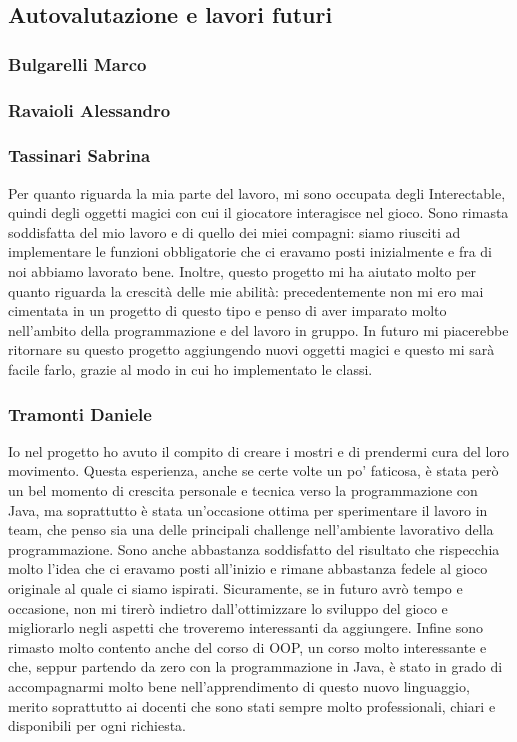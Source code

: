 \documentclass{report}
\begin{document}
\subsection{Autovalutazione e lavori futuri}

\subsubsection{Bulgarelli Marco}

\subsubsection{Ravaioli Alessandro}

\subsubsection{Tassinari Sabrina}
Per quanto riguarda la mia parte del lavoro, mi sono occupata degli Interectable, quindi degli oggetti magici con cui il giocatore interagisce nel gioco.
%
Sono rimasta soddisfatta del mio lavoro e di quello dei miei compagni: siamo riusciti ad implementare le funzioni obbligatorie che ci eravamo posti inizialmente e fra di noi abbiamo lavorato bene. 
%
Inoltre, questo progetto mi ha aiutato molto per quanto riguarda la crescità delle mie abilità: precedentemente non mi ero mai cimentata in un progetto di questo tipo e penso di aver imparato molto nell'ambito della programmazione e del lavoro in gruppo.
%
In futuro mi piacerebbe ritornare su questo progetto aggiungendo nuovi oggetti magici e questo mi sarà facile farlo, grazie al modo in cui ho implementato le classi.
%
 

\subsubsection{Tramonti Daniele}
Io nel progetto ho avuto il compito di creare i mostri e di prendermi cura del loro movimento.
%
Questa esperienza, anche se certe volte un po' faticosa, è stata però un bel momento di crescita personale e tecnica verso la programmazione con Java, ma soprattutto è stata un'occasione
%
ottima per sperimentare il lavoro in team, che penso sia una delle principali challenge nell'ambiente lavorativo della programmazione. Sono anche abbastanza soddisfatto del risultato che 
%
rispecchia molto l'idea che ci eravamo posti all'inizio e rimane abbastanza fedele al gioco originale al quale ci siamo ispirati. Sicuramente, se in futuro avrò tempo e occasione, non mi tirerò
%
indietro dall'ottimizzare lo sviluppo del gioco e migliorarlo negli aspetti che troveremo interessanti da aggiungere. Infine sono rimasto molto contento anche del corso di OOP, un corso molto
%
interessante e che, seppur partendo da zero con la programmazione in Java, è stato in grado di accompagnarmi molto bene nell'apprendimento di questo nuovo linguaggio, merito soprattutto ai docenti
%
che sono stati sempre molto professionali, chiari e disponibili per ogni richiesta.
\end{document}
